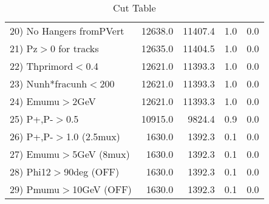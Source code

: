 \begin{table}[h!]
\begin{tabular}{||l||r|r|r|r||}
 20) No Hangers fromPVert &     12638.0 &     11407.4 &         1.0 &         0.0 \\
 21) Pz$>$0 for tracks    &     12635.0 &     11404.5 &         1.0 &         0.0 \\
 22) Thprimord$<$0.4      &     12621.0 &     11393.3 &         1.0 &         0.0 \\
 23) Nunh*fracunh$<$200   &     12621.0 &     11393.3 &         1.0 &         0.0 \\
 24) Emumu$>$2GeV         &     12621.0 &     11393.3 &         1.0 &         0.0 \\
 25) P+,P-$>$0.5          &     10915.0 &      9824.4 &         0.9 &         0.0 \\
 26) P+,P-$>$1.0 (2.5mux) &      1630.0 &      1392.3 &         0.1 &         0.0 \\
 27) Emumu$>$5GeV  (8mux) &      1630.0 &      1392.3 &         0.1 &         0.0 \\
 28) Phi12$>$90deg  (OFF) &      1630.0 &      1392.3 &         0.1 &         0.0 \\
 29) Pmumu$>$10GeV  (OFF) &      1630.0 &      1392.3 &         0.1 &         0.0 \\
 \hline
 \hline
 \end{tabular}
 \caption{Cut Table \cohjp  }
 \label{tab-cut__jpsi}
 \end{table}
